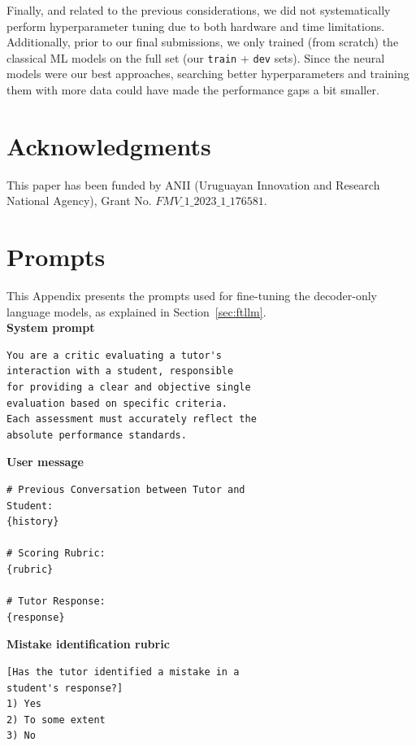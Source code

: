 \documentclass[11pt]{article}
\begin{document}
Finally, and related to the previous considerations, we did not systematically perform hyperparameter tuning due to both hardware and time limitations.
Additionally, prior to our final submissions, we only trained (from scratch) the classical ML models on the full set (our \texttt{train} + \texttt{dev} sets).
Since the neural models were our best approaches, searching better hyperparameters and training them with more data could have made the performance gaps a bit smaller.


\section*{Acknowledgments}

This paper has been funded by ANII (Uruguayan Innovation and Research National Agency), Grant No. $FMV\_1\_2023\_1\_176581$.





\appendix

\section{Prompts}
\label{sec:appendix_prompts}

This Appendix presents the prompts used for fine-tuning the decoder-only language models, as explained in Section~\ref{sec:ftllm}.\\
 
\noindent\textbf{System prompt}

\begin{verbatim}
You are a critic evaluating a tutor's 
interaction with a student, responsible
for providing a clear and objective single
evaluation based on specific criteria.
Each assessment must accurately reflect the 
absolute performance standards.
\end{verbatim}

\noindent\textbf{User message}

\begin{verbatim}
# Previous Conversation between Tutor and
Student:
{history}

# Scoring Rubric:
{rubric}

# Tutor Response:
{response}
\end{verbatim}

\noindent\textbf{Mistake identification rubric}

\begin{verbatim}
[Has the tutor identified a mistake in a 
student's response?]
1) Yes
2) To some extent
3) No
\end{verbatim}
\end{document}
